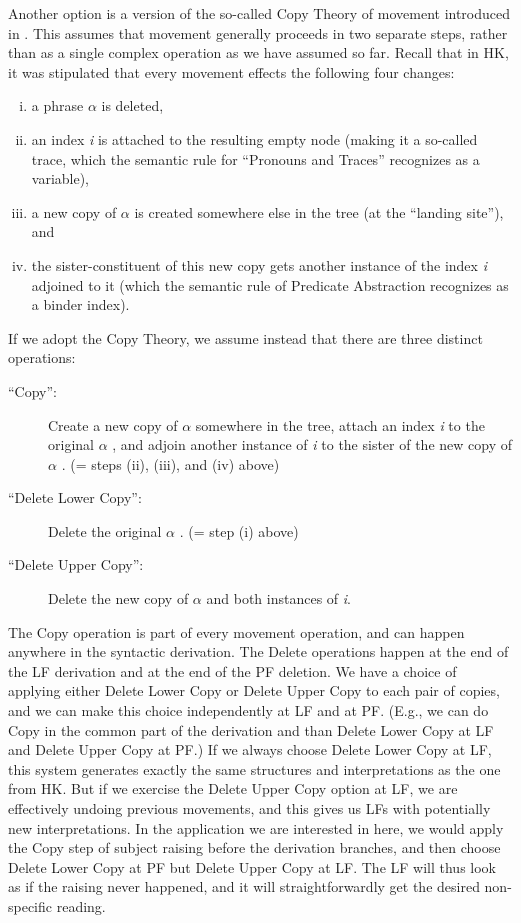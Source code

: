 Another option is a version of the so-called Copy Theory of movement introduced in \citet{chomsky:1993:minimalist}. This assumes that movement generally proceeds in two separate steps, rather than as a single complex operation as we have assumed so far. Recall that in H\amp K, it was stipulated that every movement effects the following four changes:
\begin{enumerate}
	[(i)] 
	\item a phrase $\alpha$ is deleted, 
	\item an index \emph{i} is attached to the resulting empty node (making it a so-called trace, which the semantic rule for ``Pronouns and Traces'' recognizes as a variable), 
	\item a new copy of $\alpha$ is created somewhere else in the tree (at the ``landing site''), and 
	\item the sister-constituent of this new copy gets another instance of the index \emph{i} adjoined to it (which the semantic rule of Predicate Abstraction recognizes as a binder index). 
\end{enumerate}

If we adopt the Copy Theory, we assume instead that there are three distinct operations:
\begin{description}
	
	\item[``Copy'':] Create a new copy of $\alpha$ somewhere in the tree, attach an index \emph{i} to the original $\alpha$ , and adjoin another instance of \emph{i} to the sister of the new copy of $\alpha$ . (= steps (ii), (iii), and (iv) above)
	
	\item[``Delete Lower Copy'':] Delete the original $\alpha$ . (= step (i) above)
	
	\item[``Delete Upper Copy'':] Delete the new copy of $\alpha$ and both instances of \emph{i}.
\end{description}

\noindent The Copy operation is part of every movement operation, and can happen anywhere in the syntactic derivation. The Delete operations happen at the end of the LF derivation and at the end of the PF deletion. We have a choice of applying either Delete Lower Copy or Delete Upper Copy to each pair of copies, and we can make this choice independently at LF and at PF. (E.g., we can do Copy in the common part of the derivation and than Delete Lower Copy at LF and Delete Upper Copy at PF.) If we always choose Delete Lower Copy at LF, this system generates exactly the same structures and interpretations as the one from H\amp K. But if we exercise the Delete Upper Copy option at LF, we are effectively undoing previous movements, and this gives us LFs with potentially new interpretations. In the application we are interested in here, we would apply the Copy step of subject raising before the derivation branches, and then choose Delete Lower Copy at PF but Delete Upper Copy at LF. The LF will thus look as if the raising never happened, and it will straightforwardly get the desired non-specific reading.

